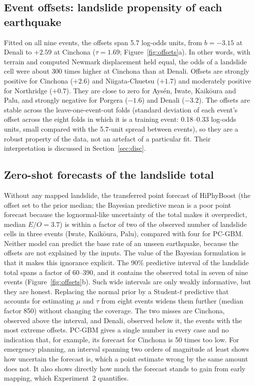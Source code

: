 

\subsection{Event offsets: landslide propensity of each earthquake}\label{sec:res_offsets}
Fitted on all nine events, the offsets span 5.7 log-odds units, from $b=-3.15$ at Denali to $+2.59$ at Cinchona ($\tau=1.69$; Figure~\ref{fig:offsets}a). In other words, with terrain and computed Newmark displacement held equal, the odds of a landslide cell were about 300 times higher at Cinchona than at Denali. Offsets are strongly positive for Cinchona ($+2.6$) and Niigata-Chuetsu ($+1.7$) and moderately positive for Northridge ($+0.7$). They are close to zero for Ays\'en, Iwate, Kaik\={o}ura and Palu, and strongly negative for Porgera ($-1.6$) and Denali ($-3.2$). The offsets are stable across the leave-one-event-out folds (standard deviation of each event's offset across the eight folds in which it is a training event: 0.18--0.33 log-odds units, small compared with the 5.7-unit spread between events), so they are a robust property of the data, not an artefact of a particular fit. Their interpretation is discussed in Section~\ref{sec:disc}.

\subsection{Zero-shot forecasts of the landslide total}
Without any mapped landslide, the transferred point forecast of HiPhyBoost (the offset set to the prior median; the Bayesian predictive mean is a poor point forecast because the lognormal-like uncertainty of the total makes it overpredict, median $E/O=3.7$) is within a factor of two of the observed number of landslide cells in three events (Iwate, Kaik\={o}ura, Palu), compared with four for PC-GBM. Neither model can predict the base rate of an unseen earthquake, because the offsets are not explained by the inputs. The value of the Bayesian formulation is that it makes this ignorance explicit. The 90\% predictive interval of the landslide total spans a factor of 60--390, and it contains the observed total in seven of nine events (Figure~\ref{fig:offsets}b). Such wide intervals are only weakly informative, but they are honest. Replacing the normal prior by a Student-$t$ predictive that accounts for estimating $\mu$ and $\tau$ from eight events widens them further (median factor 850) without changing the coverage. The two misses are Cinchona, observed above the interval, and Denali, observed below it, the events with the most extreme offsets. PC-GBM gives a single number in every case and no indication that, for example, its forecast for Cinchona is 50 times too low. For emergency planning, an interval spanning two orders of magnitude at least shows how uncertain the forecast is, which a point estimate wrong by the same amount does not. It also shows directly how much the forecast stands to gain from early mapping, which Experiment~2 quantifies.

